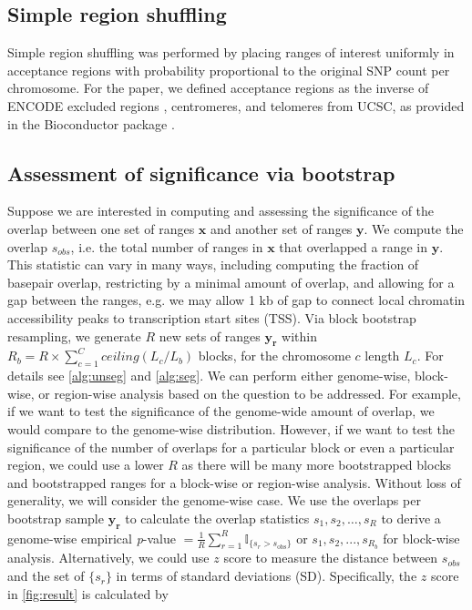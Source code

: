 \documentclass{article}
\begin{document}
\subsection{Simple region shuffling}\label{sec:shuffle}

Simple region shuffling was performed by placing ranges of interest
uniformly in acceptance regions with probability proportional to the
original SNP count per chromosome. For the paper, we defined
acceptance regions as the inverse of
ENCODE excluded regions \citep{amemiya2019encode},
centromeres, and telomeres from UCSC,
as provided in the  Bioconductor package
\citep{excluderanges}.

\subsection{Assessment of significance via bootstrap}

Suppose we are interested in computing and assessing the significance
of the overlap between one set of ranges
$\bm{x}$ and another set of ranges $\bm{y}$.
We compute the overlap $s_{obs}$, i.e. the total number of 
ranges in $\bm{x}$ that overlapped a range in $\bm{y}$.
This statistic can vary in many ways, including computing the fraction of
basepair overlap, restricting by a minimal amount of overlap, and
allowing for a gap between the ranges, e.g. we may allow 1 kb of gap
to connect local chromatin accessibility peaks to transcription start
sites (TSS).
Via block bootstrap resampling, we generate $R$ new
sets of ranges $\bm{y_r}$ within $R_b = R \times \sum_{c=1}^{C} ceiling(L_c / L_b)$ blocks, for the chromosome $c$ length $L_c$.
For details see \cref{alg:unseg} and \cref{alg:seg}.
We can perform either genome-wise, block-wise, or region-wise analysis
based on the question to be addressed. For example, if we want to test
the significance of the genome-wide amount of overlap, we would compare
to the genome-wise distribution. However, if we want to
test the significance of the number of overlaps for a particular
block or even a particular region, we could use a lower $R$ as there
will be many more bootstrapped blocks and bootstrapped ranges for a
block-wise or region-wise analysis.
Without loss of generality, we will consider the genome-wise case.
We use the overlaps per bootstrap sample $\bm{y_r}$ to calculate the
overlap statistics $s_{1}, s_{2}, \dots, s_{R}$
to derive a genome-wise empirical \textit{p}-value
$= \frac{1}{R} \sum_{r=1}^R \mathbb{I}_{\{s_r > s_\text{obs}\}}$ or
$s_{1}, s_{2},..., s_{R_b}$ for block-wise analysis.
Alternatively, we could use $z$ score to measure the
distance between $s_{obs}$ and the
set of $\{s_r\}$ in terms of standard deviations (SD).
Specifically, the
$z$ score in \cref{fig:result} is calculated by
\end{document}
